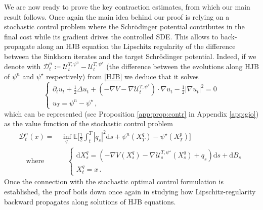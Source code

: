 \documentclass[final,12pt]{colt2023} %
\newcommand{\be}{\begin{equation}}
\newcommand{\ee}{\end{equation}}
\newcommand{\bbE}{\mathbb{E}}
\newcommand{\De}{\mathrm{d}}
\def\psistar{\psi^{\star}}
\begin{document}
We are now ready to prove the key contraction estimates, from which our main result follows. Once again the main idea behind our proof is relying on a stochastic control problem where the Schr\"odinger potential contributes in the final cost while its gradient drives the controlled SDE. This allows to back-propagate along an HJB equation the Lipschitz regularity of the difference between the Sinkhorn iterates and the target Schr\"odinger potential. Indeed, if we denote with $\mathcal{D}_t^n\coloneqq \mathcal{U}_t^{T,\psi^n}-\mathcal{U}_t^{T,\psistar}$ (the difference between the evolutions along HJB of $\psi^n$ and $\psistar$ respectively) from \eqref{HJB} we deduce that it solves
\begin{equation}\label{pde:diff}
\begin{cases}
\partial_t u_t+\frac12\Delta u_t+(-\nabla V-\nabla \mathcal{U}^{T,\psistar}_t)\cdot\nabla u_t-\frac12 |\nabla u_t|^2=0\\
u_T=\psi^n-\psistar\,,
\end{cases}
\end{equation}
 which can be represented (see Proposition \ref{app:prop:contr} in Appendix \ref{app:gio}) as the value function of the stochastic control problem
\be\label{stoch:diff}
\begin{split}
\mathcal{D}^n_t(x)=&\, \inf_{q_\cdot} \bbE\biggl[\frac{1}{2}\int_t^T|q_s|^2\De s +\psi^n(X^q_T)-\psistar(X^p_T)\biggr]\\
\quad\text{where}&\quad
\begin{cases}\De X^q_s=(-\nabla V(X^q_s)-\nabla\mathcal{U}^{T,\psistar}_s (X^q_s)+q_s)\De s + \De B_s\\
X^q_t=x\,.\end{cases}
\end{split}
\ee
Once the connection with the stochastic optimal control formulation is established, the proof boils down once again in studying how Lipschitz-regularity backward propagates along solutions of HJB equations. 
\end{document}
